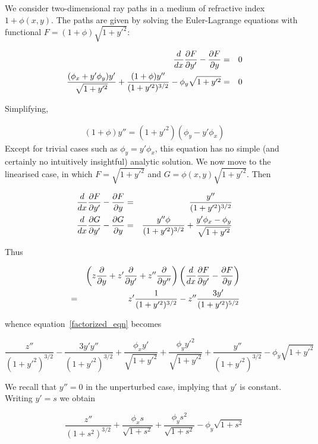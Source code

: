 \documentclass[pdflatex,sn-mathphys-num]{sn-jnl}%
\theoremstyle{thmstyleone}%
\theoremstyle{thmstyletwo}%
\theoremstyle{thmstylethree}%
\begin{document}
We consider two-dimensional ray paths in a medium of refractive index
$1+\phi(x,y)$.  The paths are given by solving the Euler-Lagrange
equations with functional $F=(1+\phi)\sqrt{1+y'^2}$:

\begin{eqnarray}
  \frac{d}{dx}\frac{\partial{F}}{\partial{y'}}-\frac{\partial{F}}{\partial{y}} &=& 0\nonumber\\
  \frac{(\phi_x+y'\phi_y)y'}{\sqrt{1+y'^2}}+\frac{(1+\phi)y''}{(1+y'^2)^{3/2}} -
  \phi_y\sqrt{1+y'^2} &=& 0
  \end{eqnarray}

Simplifying,

\begin{eqnarray}
 (1+\phi) y'' = (1+y'^2)(\phi_y - y'\phi_x)
\end{eqnarray}
%
Except for trivial cases such as $\phi_y=y'\phi_x$, this equation has
no simple (and certainly no intuitively insightful) analytic solution.
We now move to the linearised case, in which $F=\sqrt{1+y'^2}$ and
$G=\phi(x,y)\sqrt{1+y'^2}$.  Then

\begin{eqnarray}
  \frac{d}{dx}\frac{\partial{F}}{\partial{y'}} - \frac{\partial{F}}{\partial{y}} &=& \frac{y''}{(1+y'^2)^{3/2}}\nonumber\\
  \frac{d}{dx}\frac{\partial{G}}{\partial{y'}} - \frac{\partial{G}}{\partial{y}} &=& \frac{y''\phi}{(1+y'^2)^{3/2}} + \frac{y'\phi_x - \phi_y}{\sqrt{1+y'^2}}
\end{eqnarray}

Thus

\begin{eqnarray}
&{}& \left(z\frac{\partial{}}{\partial{y}} + z'\frac{\partial{}}{\partial{y'}} + z''\frac{\partial{}}{\partial{y''}}\right)\left(\frac{d}{dx}\frac{\partial{F}}{\partial{y'}} - \frac{\partial{F}}{\partial{y}}\right)\nonumber\\
&=&  z'\frac{1}{(1+y'^2)^{3/2}} -z''\frac{3y'}{(1+y'^2)^{5/2}}
\end{eqnarray}

whence equation~\ref{factorized_eqn} becomes

\begin{equation}
    \frac{z''}{(1+y'^2)^{3/2}}
  - \frac{3y'y''}{(1+y'^2)^{3/2}}
  + \frac{\phi_xy'}{\sqrt{1+y'^2}}
  + \frac{\phi_yy'^2}{\sqrt{1+y'^2}}
  + \frac{y''}{(1+y'^2)^{3/2}}-\phi_y\sqrt{1+y'^2}
\end{equation}

We recall that $y'' = 0$ in the unperturbed case, implying that $y'$
is constant.  Writing $y'= s$ we obtain

\begin{equation}\nonumber
  \frac{z''}{(1+s^2)^{3/2}} +
  \frac{\phi_xs}{\sqrt{1+s^2}} + \frac{\phi_ys^2}{\sqrt{1+s^2}} -\phi_y\sqrt{1+s^2}
\end{equation}
\end{document}
